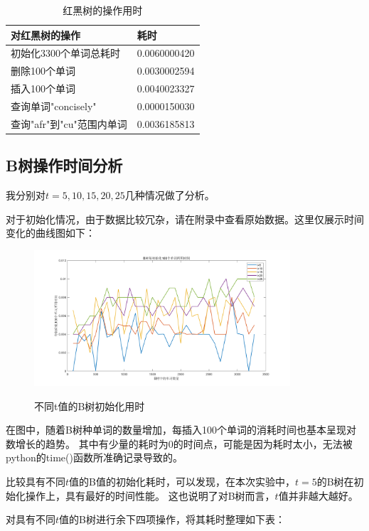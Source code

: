 \documentclass{article}
\begin{document}
\begin{table}[H]
	\centering
	\caption{红黑树的操作用时}
	\begin{tabular}{ll}
		\hline
	\textbf{对红黑树的操作}           & \textbf{耗时}           \\
	\hline
	初始化3300个单词总耗时     & 0.0060000420 \\
	删除100个单词          & 0.0030002594 \\
	插入100个单词          & 0.0040023327 \\
	查询单词"concisely"   & 0.0000150030 \\
	查询"afr"到"cu"范围内单词 & 0.0036185813 \\ 
	\hline
	\end{tabular}
	\end{table}


\subsection{B树操作时间分析}
我分别对$t=5, 10, 15, 20, 25$几种情况做了分析。

对于初始化情况，由于数据比较冗杂，请在附录中查看原始数据。这里仅展示时间变化的曲线图如下：
\begin{figure}[H]
	\centering
	{\includegraphics[width=0.85\textwidth]{时间图像绘制/BTree_init.png}} 
	\caption{不同t值的B树初始化用时}
\end{figure}

在图中，随着B树种单词的数量增加，每插入100个单词的消耗时间也基本呈现对数增长的趋势。
其中有少量的耗时为0的时间点，可能是因为耗时太小，无法被python的time()函数所准确记录导致的。

比较具有不同$t$值的B值的初始化耗时，可以发现，在本次实验中，$t=5$的B树在初始化操作上，具有最好的时间性能。
这也说明了对B树而言，$t$值并非越大越好。

对具有不同$t$值的B树进行余下四项操作，将其耗时整理如下表：
\end{document}

